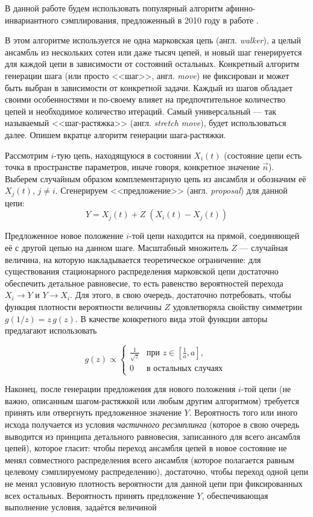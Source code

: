 В данной работе будем использовать популярный алгоритм афинно-инвариантного сэмплирования, предложенный в 2010 году в работе \cite{Goodman2010}.

В этом алгоритме используется не одна марковская цепь (англ. \textit{walker}), а целый ансамбль из нескольких сотен или даже тысяч цепей, и новый шаг генерируется для каждой цепи в зависимости от состояний остальных. Конкретный алгоритм генерации шага (или просто <<шаг>>, англ. \textit{move}) не фиксирован и может быть выбран в зависимости от конкретной задачи. Каждый из шагов обладает своими особенностями и по-своему влияет на предпочтительное количество цепей и необходимое количество итераций. Самый универсальный --- так называемый <<шаг-растяжка>> (англ. \textit{stretch move}), будет использоваться далее. Опишем вкратце алгоритм генерации шага-растяжки.

Рассмотрим $i$-тую цепь, находящуюся в состоянии $X_i(t)$ (состояние цепи есть точка в пространстве параметров, иначе говоря, конкретное значение $\vec{n}$). Выберем случайным образом комплементарную цепь из ансамбля и обозначим её $X_j(t)$, $j \neq i$. Сгенерируем <<предложение>> (англ. \textit{proposal}) для данной цепи:
\begin{equation}
	\label{eq:gw2010-stretch-move}
	Y = X_j(t) + Z \; (X_i(t) - X_j(t))
\end{equation}

Предложенное новое положение $i$-той цепи находится на прямой, соединяющей её с другой цепью на данном шаге. Масштабный множитель $Z$ --- случайная величина, на которую накладывается теоретическое ограничение: для существования стационарного распределения марковской цепи достаточно обеспечить детальное равновесие, то есть равенство вероятностей перехода $X_i \rightarrow Y$ и $Y \rightarrow X_i$. Для этого, в свою очередь, достаточно потребовать, чтобы функция плотности вероятности величины $Z$ удовлетворяла свойству симметрии $g(1 / z) = z \, g(z)$. В качестве конкретного вида этой функции авторы предлагают использовать

\begin{equation}
	g(z) \propto \begin{cases}
		\frac{1}{\sqrt{z}}& \text{при } z \in \left[\frac{1}{a}, a\right], \\
		0& \text{в остальных случаях }
	\end{cases}
\end{equation}

Наконец, после генерации предложения для нового положения $i$-той цепи (не важно, описанным шагом-растяжкой или любым другим алгоритмом) требуется принять или отвергнуть предложенное значение $Y$. Вероятность того или иного исхода получается из условия \textit{частичного ресэмплинга} (которое в свою очередь выводится из принципа детального равновесия, записанного для всего ансамбля цепей), которое гласит: чтобы переход ансамбля цепей в новое состояние не менял совместного распределения всего ансамбля (которое полагается равным целевому сэмплируемому распределению), достаточно, чтобы переход одной цепи не менял условную плотность вероятности для данной цепи при фиксированных всех остальных. Вероятность принять предложение $Y$, обеспечивающая выполнение условия, задаётся величиной

